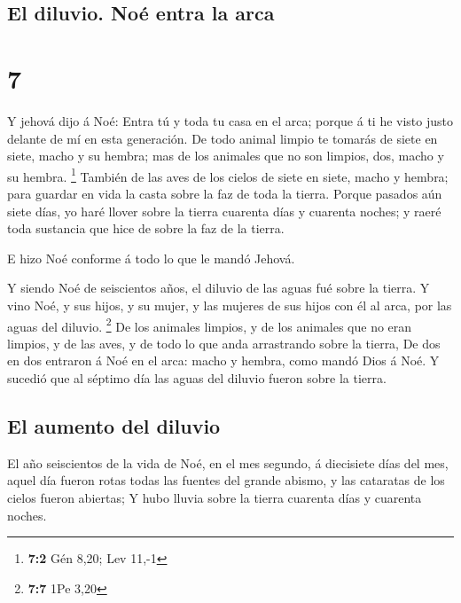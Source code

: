 \hypertarget{el-diluvio.-nouxe9-entra-la-arca}{%
\subsection{El diluvio. Noé entra la
arca}\label{el-diluvio.-nouxe9-entra-la-arca}}

\hypertarget{section-6}{%
\section{7}\label{section-6}}

 Y jehová dijo á Noé: Entra tú y toda tu casa en el arca;
porque á ti he visto justo delante de mí en esta generación.
 De todo animal limpio te tomarás de siete en siete, macho y
su hembra; mas de los animales que no son limpios, dos, macho y su
hembra. \footnote{\textbf{7:2} Gén 8,20; Lev 11,-1}  También
de las aves de los cielos de siete en siete, macho y hembra; para
guardar en vida la casta sobre la faz de toda la tierra. 
Porque pasados aún siete días, yo haré llover sobre la tierra cuarenta
días y cuarenta noches; y raeré toda sustancia que hice de sobre la faz
de la tierra.

 E hizo Noé conforme á todo lo que le mandó Jehová.

 Y siendo Noé de seiscientos años, el diluvio de las aguas
fué sobre la tierra.  Y vino Noé, y sus hijos, y su mujer, y
las mujeres de sus hijos con él al arca, por las aguas del diluvio.
\footnote{\textbf{7:7} 1Pe 3,20}  De los animales limpios, y
de los animales que no eran limpios, y de las aves, y de todo lo que
anda arrastrando sobre la tierra,  De dos en dos entraron á
Noé en el arca: macho y hembra, como mandó Dios á Noé.  Y
sucedió que al séptimo día las aguas del diluvio fueron sobre la tierra.

\hypertarget{el-aumento-del-diluvio}{%
\subsection{El aumento del diluvio}\label{el-aumento-del-diluvio}}

 El año seiscientos de la vida de Noé, en el mes segundo, á
diecisiete días del mes, aquel día fueron rotas todas las fuentes del
grande abismo, y las cataratas de los cielos fueron abiertas;
 Y hubo lluvia sobre la tierra cuarenta días y cuarenta
noches.

